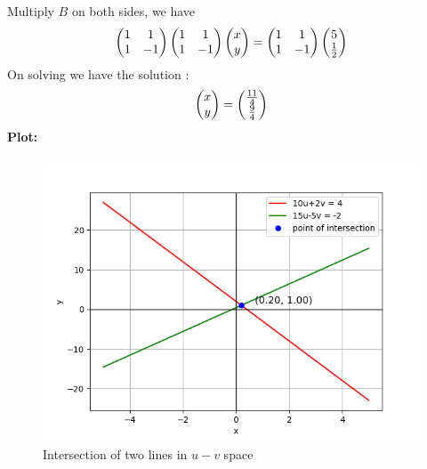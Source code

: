 \documentclass{beamer}
\begin{document}
\begin{frame}
Multiply $B$ on both sides, we have
\begin{align}
    \begin{pmatrix}1 & 1 \\ 1 & -1\end{pmatrix}\begin{pmatrix}1 & 1 \\ 1 & -1\end{pmatrix}\begin{pmatrix}x \\ y\end{pmatrix} = \begin{pmatrix}1 & 1 \\ 1 & -1\end{pmatrix}\begin{pmatrix}5 \\ \frac{1}{2}\end{pmatrix}
\end{align}
On solving we have the solution :
\begin{align}
    \begin{pmatrix}x \\ y\end{pmatrix}=\begin{pmatrix}\frac{11}{4} \\ \frac{9}{4}\end{pmatrix}
\end{align}
\textbf{Plot:}\\
\begin{figure}[h!]
   \centering
   \includegraphics[width=1\columnwidth]{figs/fig.png}
   \caption{Intersection of two lines in $u-v$ space}
\end{figure}
\end{frame}
\end{document}
